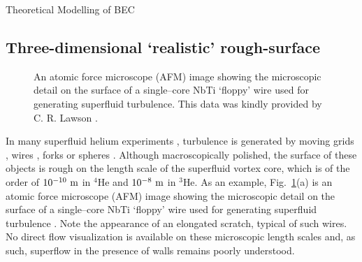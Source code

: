 \begin{chapter}{\label{cha:theoretical_model}Theoretical Modelling of BEC}
\subsection{\label{section:3dafmpotential} Three-dimensional `realistic' rough-surface}
\begin{figure}
	\centering
  \caption{An atomic force microscope (AFM) image showing the microscopic detail on the surface of a  single--core NbTi `floppy' wire used for generating superfluid turbulence. This data was kindly provided by C. R. Lawson \cite{Lawson}.}\label{fig_afmprofile}
 \end{figure}

In many superfluid helium experiments \cite{VinenSkrbek2008}, turbulence
is generated by moving grids \cite{Davis2000},
wires \cite{Guenault1986,brad05,Bradley2011,Fisher2001,goto08},
forks \cite{Blaauwgeers2007,Bradley2012} or spheres \cite{Schoepe1995}.
Although macroscopically polished, the surface of these objects is
rough on the length scale of the superfluid vortex core, which is of
the order of $10^{-10}~\rm m$ in $^4$He
and $10^{-8}~\rm m$ in $^3$He.  As an example, Fig.~\ref{fig_afmprofile}(a) is an atomic force microscope (AFM) image showing the microscopic detail on the surface of a  single--core NbTi `floppy' wire used for generating superfluid turbulence  \cite{Bradley2011}.  Note the appearance of an elongated scratch, typical of such wires.  No direct flow visualization is available on these microscopic length scales and, as such, 
superflow in the presence of walls remains poorly understood.


\end{chapter}
